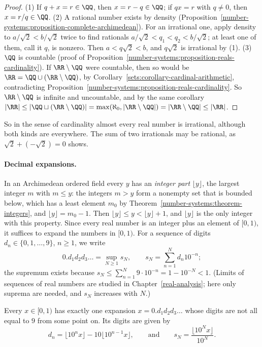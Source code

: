 \begin{proof}
(1) If $q + x = r \in \QQ$, then $x = r - q \in \QQ$; if $qx = r$ with $q \neq 0$, then $x = r/q \in \QQ$.
(2) A rational number exists by density (Proposition~\ref{number-systems:proposition-complete-archimedean}). For an irrational one, apply density to $a/\sqrt 2 < b/\sqrt 2$ twice to find rationals
$a/\sqrt 2 < q_1 < q_2 < b/\sqrt 2$; at least one of them, call it $q$, is nonzero. Then $a < q\sqrt 2 < b$, and $q\sqrt 2$ is irrational by (1).
(3) $\QQ$ is countable (proof of Proposition~\ref{number-systems:proposition-reals-cardinality}). If $\RR \setminus \QQ$ were countable, then so would be $\RR = \QQ \cup (\RR \setminus \QQ)$, by
Corollary~\ref{sets:corollary-cardinal-arithmetic}, contradicting Proposition~\ref{number-systems:proposition-reals-cardinality}. So $\RR \setminus \QQ$ is infinite and uncountable, and by the same corollary
$|\RR| \leq |\QQ \sqcup (\RR \setminus \QQ)| = \max(\aleph_0, |\RR \setminus \QQ|) = |\RR \setminus \QQ| \leq |\RR|$.
\end{proof}

So in the sense of cardinality almost every real number is irrational, although both kinds are everywhere. The sum of two irrationals may be rational, as $\sqrt 2 + (-\sqrt 2) = 0$ shows.

\paragraph{Decimal expansions.} In an Archimedean ordered field every $y$ has an \emph{integer part} $\lfloor y\rfloor$, the largest integer $m$ with $m \leq y$: the integers $m > y$ form a nonempty set that is
bounded below, which has a least element $m_0$ by Theorem~\ref{number-systems:theorem-integers}, and $\lfloor y\rfloor = m_0 - 1$. Then $\lfloor y\rfloor \leq y < \lfloor y\rfloor + 1$, and $\lfloor y\rfloor$ is the only
integer with this property. Since every real number is an integer plus an element of $[0, 1)$, it suffices to expand the numbers in $[0, 1)$. For a sequence of digits $d_n \in \{0, 1, \ldots, 9\}$, $n \geq 1$,
we write
\[
0.d_1d_2d_3\ldots = \sup_{N \geq 1}s_N, \qquad s_N = \sum_{n=1}^Nd_n10^{-n};
\]
the supremum exists because $s_N \leq \sum_{n=1}^N9 \cdot 10^{-n} = 1 - 10^{-N} < 1$. (Limits of sequences of real numbers are studied in Chapter~\ref{real-analysis}; here only suprema are needed, and
$s_N$ increases with $N$.)

\begin{theorem}\label{number-systems:theorem-decimals}
Every $x \in [0, 1)$ has exactly one expansion $x = 0.d_1d_2d_3\ldots$ whose digits are not all equal to $9$ from some point on. Its digits are given by
\[
d_n = \lfloor 10^nx\rfloor - 10\lfloor 10^{n-1}x\rfloor, \qquad\text{and}\qquad s_N = \frac{\lfloor 10^Nx\rfloor}{10^N}.
\]
\end{theorem}

